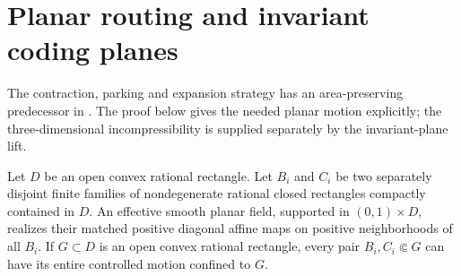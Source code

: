 \section{Planar routing and invariant coding planes}\label{sec:sheets-planes}
The contraction, parking and expansion strategy has an area-preserving predecessor in \cite[Proposition~5.1]{CardonaMirandaPeraltaSalasPresas2021}. The proof below gives the needed planar motion explicitly; the three-dimensional incompressibility is supplied separately by the invariant-plane lift.
\begin{lemma}\label{lem:sa-planar-routing}
Let $D$ be an open convex rational rectangle.  Let $B_i$ and $C_i$ be
two separately disjoint finite families of nondegenerate rational closed
rectangles compactly contained in $D$.  An effective smooth planar field,
supported in $(0,1)\times D$, realizes their matched positive diagonal
affine maps on positive neighborhoods of all $B_i$.  If $G\subset D$ is
an open convex rational rectangle, every pair $B_i,C_i\Subset G$ can have
its entire controlled motion confined to $G$.
\end{lemma}
